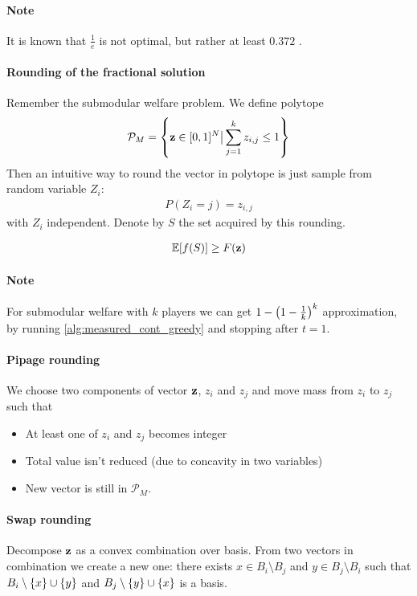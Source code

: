 \paragraph{Note} It is known that $\frac{1}{e}$ is not optimal, but rather at least $0.372$ \cite{ene2016constrained}.

\paragraph{Rounding of the fractional solution}
Remember the submodular welfare problem. We define polytope
\begin{align}
\mathcal{P}_M = \qty{ \vb{z} \in [0,1]^N \big\vert \sum_{j=1}^k z_{i,j} \leq 1}
\end{align}
Then an intuitive way to round the vector in polytope is just sample from random variable $Z_i$:
\begin{align}
P(Z_i= j) = z_{i,j}
\end{align}
with $Z_i$ independent. Denote by $S$ the set acquired by this rounding.
\begin{prop}
	\begin{align}
	\mathbb{E}\qty[f(S)] \geq F(\vb{z})
	\end{align}
\end{prop}

\paragraph{Note} For submodular welfare with $k$ players we can get $1-\qty(1-\frac{1}{k})^k$ approximation, by running \vref{alg:measured_cont_greedy} and stopping after $t=1$.


\paragraph{Pipage rounding}
We choose two components of vector $\vb{z}$, $z_i$ and $z_j$ and move mass from $z_i$ to $z_j$ such that
\begin{itemize}
	\item At least one of  $z_i$ and $z_j$ becomes integer
	\item Total value isn't reduced (due to concavity in two variables)
	\item New vector is still in $\mathcal{P}_M$. 
\end{itemize}
\paragraph{Swap rounding}
Decompose $\vb{z}$ as a convex combination over basis. From two vectors in combination we create a new one: there exists $x\in B_i \setminus B_j$ and $y\in B_j \setminus B_i$ such that $B_i \setminus \qty{x} \cup \qty{y}$ and $B_j \setminus \qty{y} \cup \qty{x}$ is a basis.